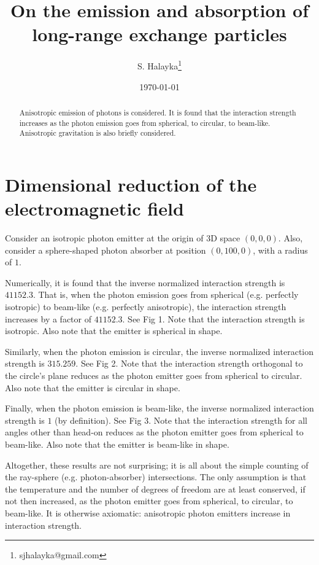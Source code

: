 \documentclass[12pt]{article}
\title{On the emission and absorption of long-range exchange particles }
\author{S. Halayka\footnote{sjhalayka@gmail.com}}
\date{\today}
\begin{document}
\maketitle

\begin{abstract}
Anisotropic emission of photons is considered.
It is found that the interaction strength increases as the photon emission goes from spherical, to circular, to beam-like.
Anisotropic gravitation is also briefly considered.
\end{abstract}



\section{Dimensional reduction of the electromagnetic field}

Consider an isotropic photon emitter at the origin of 3D space $(0, 0, 0)$.
Also, consider a sphere-shaped photon absorber at position $(0, 100, 0)$, with a radius of $1$.

Numerically, it is found that the inverse normalized interaction strength is $41152.3$.
That is, when the photon emission goes from spherical (e.g. perfectly isotropic) to beam-like (e.g. perfectly anisotropic), the interaction strength increases by a factor of $41152.3$.
See Fig 1.
Note that the interaction strength is isotropic.
Also note that the emitter is spherical in shape.

Similarly, when the photon emission is circular, the inverse normalized interaction strength is $315.259$.
See Fig 2.
Note that the interaction strength orthogonal to the circle's plane reduces as the photon emitter goes from spherical to circular.
Also note that the emitter is circular in shape.

Finally, when the photon emission is beam-like, the inverse normalized interaction strength is $1$ (by definition).
See Fig 3.
Note that the interaction strength for all angles other than head-on reduces as the photon emitter goes from spherical to beam-like.
Also note that the emitter is beam-like in shape.

Altogether, these results are not surprising; it is all about the simple counting of the ray-sphere (e.g. photon-absorber) intersections.
The only assumption is that the temperature and the number of degrees of freedom are at least conserved, if not then increased, as the photon emitter goes from spherical, to circular, to beam-like.
It is otherwise axiomatic: anisotropic photon emitters increase in interaction strength.
\end{document}
